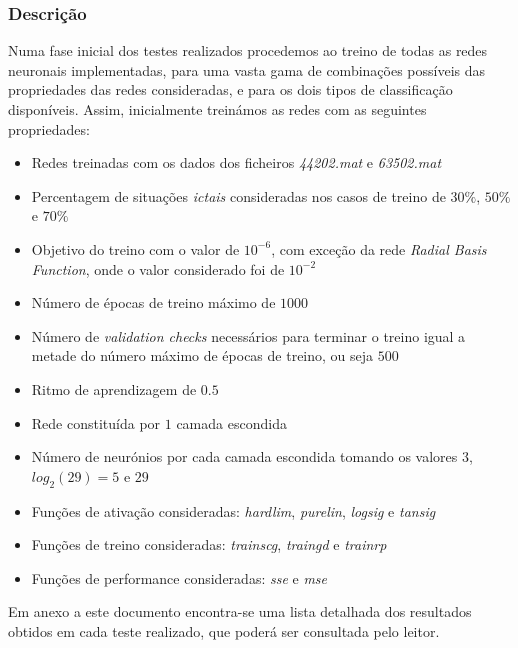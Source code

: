 \documentclass{article}
\begin{document}
\subsubsection{Descrição}

Numa fase inicial dos testes realizados procedemos ao treino de todas as redes neuronais implementadas, para uma vasta gama de combinações possíveis das propriedades das redes consideradas, e para os dois tipos de classificação disponíveis. Assim, inicialmente treinámos as redes com as seguintes propriedades: 

\begin{itemize}
\item Redes treinadas com os dados dos ficheiros \emph{44202.mat} e \emph{63502.mat}

\item Percentagem de situações \emph{ictais} consideradas nos casos de treino de $30\%$, $50\%$ e $70\%$

\item Objetivo do treino com o valor de $10^{-6}$, com exceção da rede \emph{Radial Basis Function}, onde o valor considerado foi de $10^{-2}$

\item Número de épocas de treino máximo de $1000$

\item Número de \emph{validation checks} necessários para terminar o treino igual a metade do número máximo de épocas de treino, ou seja $500$

\item Ritmo de aprendizagem de $0.5$

\item Rede constituída por $1$ camada escondida

\item Número de neurónios por cada camada escondida tomando os valores $3$, $log_{2} (29) = 5$ e $29$ 

\item Funções de ativação consideradas: \emph{hardlim}, \emph{purelin}, \emph{logsig} e \emph{tansig}

\item Funções de treino consideradas: \emph{trainscg}, \emph{traingd} e \emph{trainrp}

\item Funções de performance consideradas: \emph{sse} e \emph{mse}
\end{itemize}

Em anexo a este documento encontra-se uma lista detalhada dos resultados obtidos em cada teste realizado, que poderá ser consultada pelo leitor.
\end{document}
